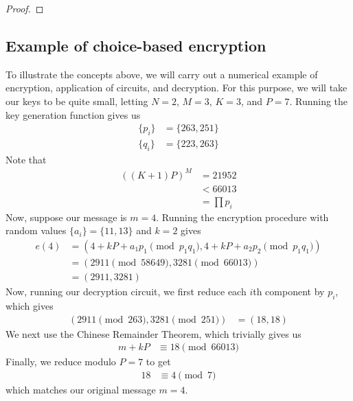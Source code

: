 \documentclass[11pt]{report}
\begin{document}
\begin{proof}
\end{proof}


\subsection{Example of choice-based encryption}
\label{sec:cbe_example}

To illustrate the concepts above, we will carry out a numerical example of encryption, application of circuits, and decryption. For this purpose, we will take our keys to be quite small, letting $N=2$, $M=3$, $K=3$, and $P=7$. Running the key generation function gives us
\begin{align*}
\{p_i\} &= \{263,251\}\\
\{q_i\} &= \{223,263\}
\end{align*}
Note that
\begin{align*}
((K+1)P)^M &= 21952\\
&< 66013\\
&= \prod p_i
\end{align*}
Now, suppose our message is $m=4$. Running the encryption procedure with random values $\{a_i\} = \{11,13\}$ and $k=2$ gives
\begin{align*}
e(4) &= (4+kP+a_1p_1 \pmod{p_1q_1},4+kP+a_2p_2\pmod{p_1q_1}) \\
&= (2911 \pmod{58649}, 3281 \pmod{66013})\\
&= (2911, 3281)
\end{align*}
Now, running our decryption circuit, we first reduce each $i$th component by $p_i$, which gives
\begin{align*}
(2911 \pmod{263}, 3281 \pmod{251}) &= (18,18)
\end{align*}
We next use the Chinese Remainder Theorem, which trivially gives us
\begin{align*}
m+kP &\equiv 18 \pmod{66013}
\end{align*}
Finally, we reduce modulo $P=7$ to get
\begin{align*}
18 &\equiv 4 \pmod{7}
\end{align*}
which matches our original message $m=4$.
\end{document}
